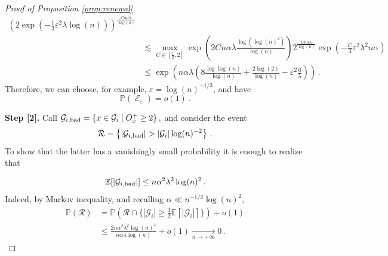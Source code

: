 \documentclass[11pt,oneside]{amsart}
\numberwithin{equation}{section}  %
\theoremstyle{plain}
\DeclareMathOperator{\cE}{\mathcal{E}}
\newcommand{\E}{\mathbb{E}}
\newcommand{\p}{\mathbb{P}}
\newcommand{\conv}{\xrightarrow[n \to +\infty]{}}
\newcommand{\gates}{\mathcal{G}}
\begin{document}
\begin{proof}[Proof of Proposition \ref{prop:renewal}]
\begin{equation}
\begin{split}
           \left(2\exp\left(-\tfrac13 \varepsilon^2\lambda \log(n)\right)\right)^{\frac{C n\alpha \lambda}{\log(n)}} \\
            & \lesssim \max_{C \in \left[\frac{1}{2},2\right]}\exp{\left(2C n\alpha\lambda\frac{\log(\log(n)^2)}{\log(n)}\right)}
            2^{\frac{C n\alpha \lambda}{\log(n)}}\exp\left(-\tfrac C3 \varepsilon^2\lambda^2 n\alpha\right) \\
            &\le \exp\left(n\alpha\lambda\left(8\frac{\log\log(n)}{\log(n)}+{\frac{2 \log(2) }{\log(n)}}-\varepsilon^2\frac 6\lambda\right)\right)\,.
		\end{split}
	\end{equation} 
    Therefore, we can choose, for example, $\varepsilon=\log(n)^{-1/3}$, and have
	\begin{equation}\label{eq:est-E}
		\p(\cE_\varepsilon)=o(1)\,.
	\end{equation}
    
{\bf Step [2].}   Call
    $
		\gates_{i,\rm bad}=\left\{x \in \gates_i \mid O_x^+ \ge 2\right\},
    $
	and consider the event
	\begin{equation}
		\mathcal{R}=\left\{|\gates_{i,\rm bad}|>|\gates_i|\log(n)^{-2} \right\}\,.
	\end{equation}
	To show that the latter has a vanishingly small probability it is enough to realize that

	\begin{equation}
		\E[|\gates_{i,\rm bad}|]\le n\alpha^2\lambda^2\log(n)^2\,.
	\end{equation}
	Indeed, by Markov inequality, and recalling $\alpha \ll n^{-1/2} \log(n)^2$,
	\begin{equation}\label{eq:est-D}
		\begin{split}
			\p\left(\mathcal{R} \right)&=\p\left(\mathcal{R}\cap \{|\gates_i|\ge \tfrac12\E[|\gates_i|]\} \right)+o(1)\\
			&\le \frac{2n\alpha^2\lambda^2\log(n)^4}{n\alpha\lambda\log(n)}+o(1)\conv 0\,.
		\end{split}
	\end{equation}
    

\end{proof}
\end{document}
